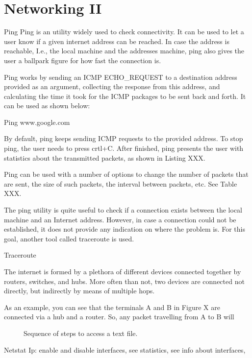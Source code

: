 \chapter{Networking II}\label{ch:networking2}

Ping
Ping is an utility widely used to check connectivity. It can be used to let a user know if a given internet address can be reached. In case the address is reachable,  I.e., the local machine and the addresses machine, ping also gives the user a ballpark figure for how fast the connection is.

 Ping works by sending an ICMP ECHO\_REQUEST to a destination address provided as an argument, collecting the response from this address, and calculating the time it took for the ICMP packages to be sent back and forth. It can be used as shown below:

Ping www.google.com

By default, ping keeps sending ICMP requests to the provided address. To stop ping, the user needs to press crtl+C. After finished, ping presents the user with statistics about the transmitted packets, as shown in Listing XXX.

Ping can be used with a number of options to change the number of packets that are sent, the size of such packets, the interval between packets, etc. See Table XXX.

The ping utility is quite useful to check if a connection exists between the local machine and an Internet address. However, in case a connection could not be established, it does not provide any indication on where the problem is. For this goal, another tool called traceroute is used.


Traceroute

The internet is formed by a plethora of different devices connected together by routers, switches, and hubs. More often than not, two devices are connected not directly, but indirectly by means of multiple hops.

As an example, you can see that the terminals A and B in Figure X are connected via a hub and a router. So, any packet travelling from A to B will 

\begin{figure}[!htbp]
  \centering
        
        \caption{Sequence of steps to access a text file.}
        \label{fig:ch9_accessing_file}
\end{figure}

Netstat
Ip: enable and disable interfaces, see statistics, see info about interfaces, 
